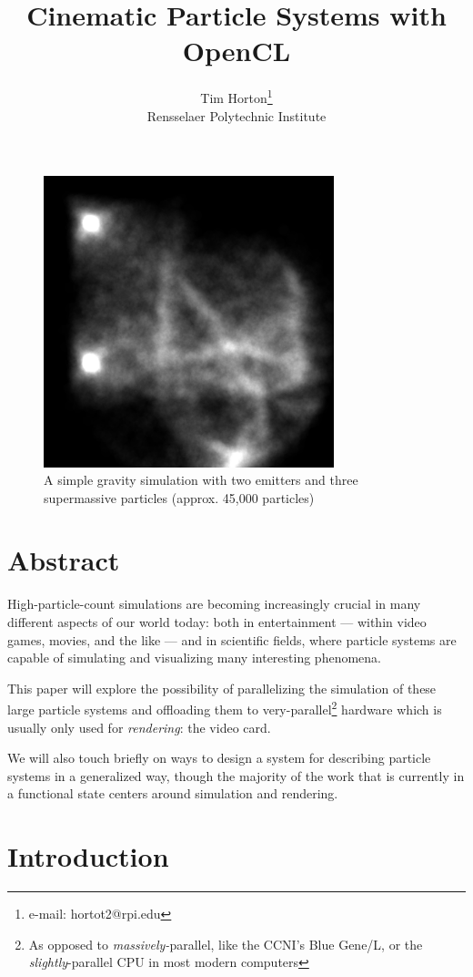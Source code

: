 \documentclass{acmsiggraph}
\title{Cinematic Particle Systems with OpenCL}
\author{Tim Horton\thanks{e-mail: hortot2@rpi.edu}\\Rensselaer Polytechnic Institute}
\begin{document}
\maketitle

\begin{figure}
    \includegraphics[width=84.5mm]{gravity.png}
    \caption{A simple gravity simulation with two emitters and three supermassive particles (approx. 45,000 particles)}
    \label{titlefig}
\end{figure}

\section*{Abstract}

High-particle-count simulations are becoming increasingly crucial in many different aspects of our world today: both in entertainment --- within video games, movies, and the like --- and in scientific fields, where particle systems are capable of simulating and visualizing many interesting phenomena.

This paper will explore the possibility of parallelizing the simulation of these large particle systems and offloading them to very-parallel\footnote{As opposed to {\it massively-}parallel, like the CCNI's Blue Gene/L, or the {\it slightly}-parallel CPU in most modern computers} hardware which is usually only used for {\it rendering}: the video card.

We will also touch briefly on ways to design a system for describing particle systems in a generalized way, though the majority of the work that is currently in a functional state centers around simulation and rendering.

\section{Introduction}
\end{document}
